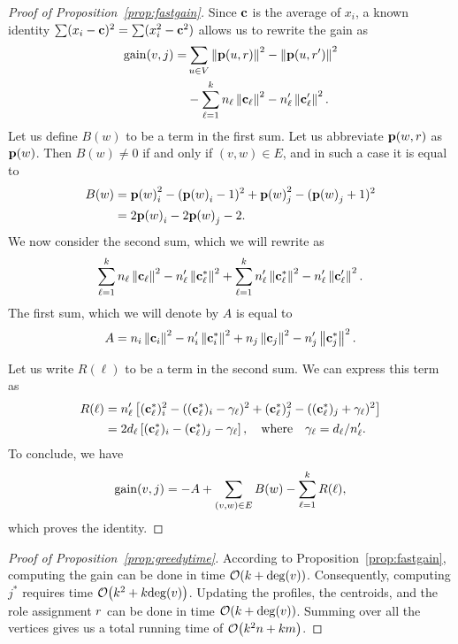 \begin{proof}[Proof of Proposition~\ref{prop:fastgain}]
Since $\mathbf{c}$ is the average of $x_i$,
a known identity $\sum (x_i - \mathbf{c})^2 = \sum (x_i^2 - \mathbf{c}^2)$ allows us to 
rewrite the gain as
\[
\begin{split}
	\gain{v, j} = & \sum_{u \in V} \norm{\prof{u, \role}}^2 -  \norm{\prof{u, \role'}}^2 \\
	& - \sum_{\ell = 1}^k n_\ell \norm{\centroid_\ell}^2 -  n_\ell' \norm{\centroid_\ell'}^2.
\end{split}
\]
Let us define $B(w)$ to be a term in the first sum.
Let us abbreviate $\prof{w, \role}$ as $\prof{w}$.
Then $B(w) \neq 0$ if and only if $(v, w) \in E$,
and in such a case it is equal to
\[
\begin{split}
	B(w) & = \prof{w}_i^2 - (\prof{w}_i - 1)^2 + \prof{w}_j^2 - (\prof{w}_j + 1)^2 \\
	& = 2\prof{w}_i - 2\prof{w}_j  - 2.
\end{split}
\]
We now consider the second sum, which we will rewrite as
\[
	\sum_{\ell = 1}^k n_\ell \left\|\mathbf{c}_\ell\right\|^2 -  n_\ell' \left\|\mathbf{c}_\ell^*\right\|^2 +
	\sum_{\ell = 1}^k n_\ell' \left\|\mathbf{c}_\ell^*\right\|^2 -  n_\ell' \left\|\mathbf{c}_\ell'\right\|^2.
\]
The first sum, which we will denote by $A$ is equal to
\[
	A = n_i\left\|\mathbf{c}_i\right\|^2 - n_i'\left\|\mathbf{c}_i^*\right\|^2 + n_j\left\|\mathbf{c}_j\right\|^2 - n_j'\left\|\mathbf{c}_j^*\right\|^2. 
\]

Let us write $R(\ell)$ to be a term in the second sum. We can express this term as
\[
\begin{split}
	R(\ell) & = n_\ell'\left[(\mathbf{c}_\ell^*)_i^2 - ((\mathbf{c}_\ell^*)_i - \gamma_\ell)^2 + (\mathbf{c}_\ell^*)_j^2 - ((\mathbf{c}_\ell^*)_j +  \gamma_\ell)^2\right] \\
	        & = 2d_\ell \left[(\mathbf{c}_\ell^*)_i - (\mathbf{c}_\ell^*)_j -  \gamma_\ell\right], \quad \text{where} \quad \gamma_\ell = d_\ell / n_\ell'.
\end{split}
\]
To conclude, we have
\[
	\gain{v, j} = - A + \sum_{(v, w) \in E} B(w) - \sum_{\ell = 1}^k R(\ell),
\]
which proves the identity.
\end{proof}



\begin{proof}[Proof of Proposition~\ref{prop:greedytime}]
According to Proposition~\ref{prop:fastgain}, computing the gain can be done in time $\bigO{k + \dg{v}}$. 
Consequently, computing $j^*$ requires time $\bigO{k^2 + k\dg{v}}$. 
Updating the profiles, the centroids, and the role assignment $r$
can be done in time $\bigO{k + \dg{v}}$. 
Summing over all the vertices gives us a total running time of $\bigO{k^2 n + km}$.
\end{proof}

